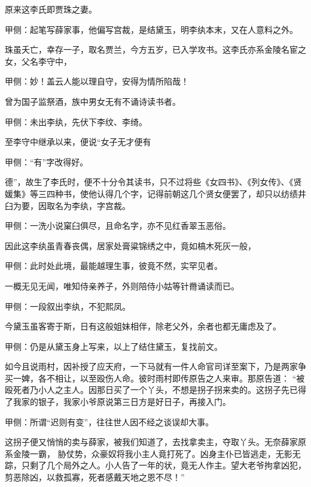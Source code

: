 \begin{parag}
    原来这李氏即贾珠之妻。\begin{note}甲侧：起笔写薛家事，他偏写宫裁，是结黛玉，明李纨本末，又在人意料之外。\end{note}珠虽夭亡，幸存一子，取名贾兰，今方五岁，已入学攻书。这李氏亦系金陵名宦之女，父名李守中，\begin{note}甲侧：妙！盖云人能以理自守，安得为情所陷哉！\end{note}曾为国子监祭酒，族中男女无有不诵诗读书者。\begin{note}甲侧：未出李纨，先伏下李纹、李绮。\end{note}至李守中继承以来，便说“女子无才便有\begin{note}甲侧：“有”字改得好。\end{note}德”，故生了李氏时，便不十分令其读书，只不过将些《女四书》、《列女传》、《贤媛集》等三四种书，使他认得几个字，记得前朝这几个贤女便罢了，却只以纺绩井臼为要，因取名为李纨，字宫裁。\begin{note}甲侧：一洗小说窠臼俱尽，且命名字，亦不见红香翠玉恶俗。\end{note}因此这李纨虽青春丧偶，居家处膏粱锦绣之中，竟如槁木死灰一般，\begin{note}甲侧：此时处此境，最能越理生事，彼竟不然，实罕见者。\end{note}一概无见无闻，唯知侍亲养子，外则陪侍小姑等针黹诵读而已。\begin{note}甲侧：一段叙出李纨，不犯熙凤。\end{note}今黛玉虽客寄于斯，日有这般姐妹相伴，除老父外，余者也都无庸虑及了。\begin{note}甲侧：仍是从黛玉身上写来，以上了结住黛玉，复找前文。\end{note}
\end{parag}


\begin{parag}
    如今且说雨村，因补授了应天府，一下马就有一件人命官司详至案下，乃是两家争买一婢，各不相让，以至殴伤人命。彼时雨村即传原告之人来审。那原告道： “被殴死者乃小人之主人。因那日买了一个丫头，不想是拐子拐来卖的。这拐子先已得了我家的银子，我家小爷原说第三日方是好日子，再接入门。\begin{note}甲侧：所谓“迟则有变”，往往世人因不经之谈误却大事。\end{note}这拐子便又悄悄的卖与薛家，被我们知道了，去找拿卖主，夺取丫头。无奈薛家原系金陵一霸， 胁仗势，众豪奴将我小主人竟打死了。凶身主仆已皆逃走，无影无踪，只剩了几个局外之人。小人告了一年的状，竟无人作主。望大老爷拘拿凶犯，剪恶除凶，以救孤寡，死者感戴天地之恩不尽！”
\end{parag}


